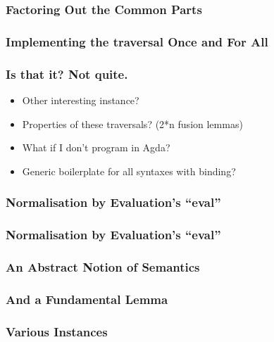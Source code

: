 \documentclass[xetex, mathserif, serif]{beamer}
\begin{document}
  \begin{frame}\frametitle{Factoring Out the Common Parts}
    \unskip
    \unskip
    \unskip
  \end{frame}

  \begin{frame}\frametitle{Implementing the traversal Once and For All}
    \unskip
    \unskip
  \end{frame}

  \begin{frame}\frametitle{Is that it? Not quite.}
    \begin{itemize}
      \item Other interesting instance?
      \item Properties of these traversals? (2*n fusion lemmas)
      \item What if I don't program in Agda?
      \item Generic boilerplate for all syntaxes with binding?
    \end{itemize}
  \end{frame}

  \begin{frame}\frametitle{Normalisation by Evaluation's ``eval''}
    \vspace{-3em}
  \end{frame}
  \begin{frame}\frametitle{Normalisation by Evaluation's ``eval''}
  \end{frame}


  \begin{frame}\frametitle{An Abstract Notion of Semantics}
  \end{frame}

  \begin{frame}\frametitle{And a Fundamental Lemma}
    \vspace{-1.5em}
  \end{frame}

  \begin{frame}\frametitle{Various Instances}
  \end{frame}
\end{document}
